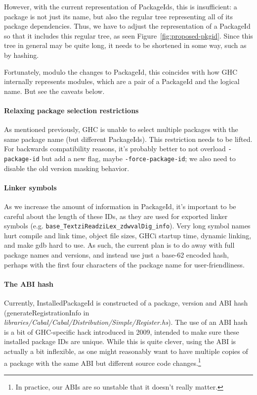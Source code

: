 \documentclass{article}
\newcommand{\ghcfile}[1]{\textsl{#1}}
\begin{document}
However, with the current representation of PackageIds, this is
insufficient: a package is not just its name, but also the regular
tree representing all of its package dependencies.  Thus, we have
to adjust the representation of a PackageId so that it includes this
regular tree, as seen Figure~\ref{fig:proposed-pkgid}.  Since this
tree in general may be quite long, it needs to be shortened in some way,
such as by hashing.

Fortunately, modulo the changes to PackageId, this coincides with how
GHC internally represents modules, which are a pair of a PackageId and the
logical name.  But see the caveats below.

\paragraph{Relaxing package selection restrictions}  As mentioned
previously, GHC is unable to select multiple packages with the same
package name (but different PackageIds).  This restriction needs to be
lifted.  For backwards compatibility reasons, it's probably better to
not overload \verb|-package-id| but add a new flag, maybe \verb|-force-package-id|;
we also need to disable the old version masking behavior.

\paragraph{Linker symbols} As we increase the amount of information in
PackageId, it's important to be careful about the length of these IDs,
as they are used for exported linker symbols (e.g.
\verb|base_TextziReadziLex_zdwvalDig_info|).  Very long symbol names
hurt compile and link time, object file sizes, GHCi startup time,
dynamic linking, and make gdb hard to use.  As such, the current plan is
to do away with full package names and versions, and instead use just a
base-62 encoded hash, perhaps with the first four characters of the package
name for user-friendliness.

\paragraph{The ABI hash} Currently, InstalledPackageId
is constructed of a package, version and ABI hash
(generateRegistrationInfo in
\ghcfile{libraries/Cabal/Cabal/Distribution/Simple/Register.hs}).  The
use of an ABI hash is a bit of GHC-specific hack introduced in 2009,
intended to make sure these installed package IDs are unique.  While
this is quite clever, using the ABI is actually a bit inflexible, as one
might reasonably want to have multiple copies of a package with the same
ABI but different source code changes.\footnote{In practice, our ABIs
are so unstable that it doesn't really matter.}
\end{document}
